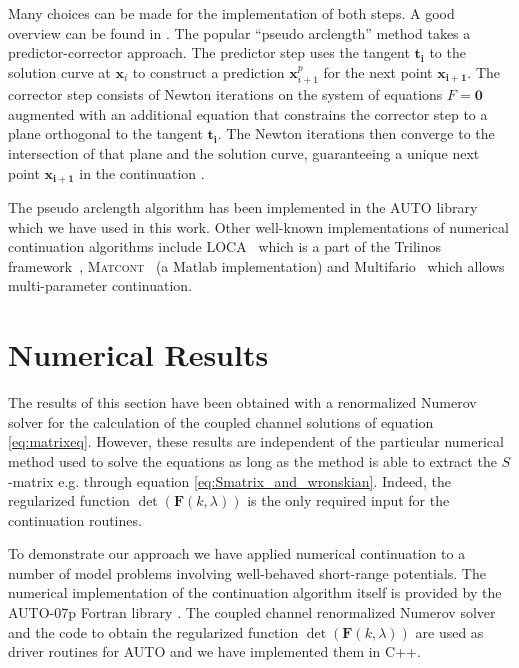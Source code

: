 \documentclass[mathpazo]{cicp}
\begin{document}
Many choices can be made for the implementation of both steps. A good overview can be found in \cite{Seydel1994,Doedel2007,Allgower1990,Keller1977}. 
The popular ``pseudo arclength'' method \cite{Keller1969} takes a predictor-corrector approach. The predictor step uses the tangent $\mathbold{t_{i}}$ to the solution curve at $\mathbold{x}_{i}$ to construct 
a prediction $\mathbold{x}_{i+1}^{p}$ for the next point $\mathbold{x_{i+1}}$. The corrector step consists of Newton iterations on the system of equations $F = \mathbold{0}$ 
augmented with an additional equation that constrains the corrector step to a plane orthogonal to the tangent $\mathbold{t_{i}}$. The Newton iterations then converge to the intersection of that plane and the solution curve, guaranteeing a unique next point $\mathbold{x_{i+1}}$ in the continuation  \cite{Keller1969}.

The pseudo arclength algorithm has been implemented in the AUTO \cite{Doedel1981,AUTO2007} library which we have used in this work. 
Other well-known implementations of numerical continuation algorithms include LOCA~\cite{Salinger2002} which is a part of the Trilinos 
framework~\cite{Heroux2005}, \textsc{Matcont}~\cite{Dhooge2006} (a Matlab implementation) and Multifario~\cite{Henderson2002} 
which allows multi-pa\-ra\-me\-ter continuation.

\section{Numerical Results}
\label{sec:results}
The results of this section have been obtained with a renormalized Numerov solver \cite{Johnson1977,Johnson1978} for the calculation of the coupled channel solutions of equation \eqref{eq:matrixeq}. 
However, these results are independent of the particular numerical method used to solve the equations as long as the method is able to extract the $S$-matrix e.g. through equation \eqref{eq:Smatrix_and_wronskian}. 
Indeed, the regularized function $\det(\mathbold{F}(k,\lambda))$ is the only required input for the continuation routines.

To demonstrate our approach we have applied numerical continuation to a number of model problems involving well-behaved short-range potentials. The numerical implementation of the 
continuation algorithm  itself is provided by the AUTO-07p Fortran library \cite{AUTO2007}. The coupled channel renormalized Numerov solver and the code to obtain the regularized 
function $\det(\mathbold{F}(k,\lambda))$ are used as driver routines for AUTO and we have implemented them in C++.
\end{document}
